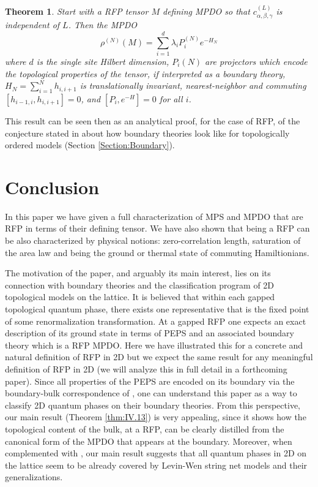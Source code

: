\documentclass{elsarticle}
\newtheorem{thm}{Theorem}[section]
\begin{document}
\begin{thm}
    Start with a  RFP tensor $M$  defining  MPDO so that $c_{\alpha,\beta,\gamma}^{(L)}$  is independent of $L$. Then the MPDO
    $$\rho^{(N)}(M)=\sum_{i=1}^d \lambda_i P^{(N)}_i e^{-H_N}$$ where $d$ is the single site Hilbert dimension, $P_i{(N)}$ are projectors which encode the {\em topological properties of the tensor, if interpreted as a boundary theory}, $H_N=\sum_{i=1}^Nh_{i,i+1}$ is translationally invariant, nearest-neighbor and commuting $[h_{i-1,i},h_{i,i+1}]=0$, and $[P_i,e^{-H}]=0$ for all $i$.
\end{thm}


This result can be seen then as an analytical proof, for the case of RFP, of the conjecture stated in \cite{bulkboundconj} about how boundary theories look like for topologically ordered models (Section \ref{Section:Boundary}).

\section{Conclusion}

In this paper we have given a full characterization of MPS and MPDO that are RFP in terms of their defining tensor. We have also shown that being a RFP can be also characterized by physical notions: zero-correlation length, saturation of the area law and being the ground or thermal state of commuting Hamiltionians.

The motivation of the paper, and arguably its main interest, lies on its connection with boundary theories and the classification program of 2D topological models on the lattice. It is believed that within each gapped topological quantum phase, there exists one representative that is the fixed point of some renormalization transformation. At a gapped RFP one expects an exact description of its ground state in terms of PEPS and an associated boundary theory which is a RFP MPDO. Here we have illustrated this for a concrete and natural definition of RFP in 2D but we expect the same result for any meaningful definition of RFP in 2D (we will analyze this in full detail in a forthcoming paper).  Since all properties of the PEPS are encoded on its boundary via the boundary-bulk correspondence of \cite{bulkboundary}, one can understand this paper as a way to classify 2D quantum phases on their boundary theories. From this perspective, our main result (Theorem \ref{thm:IV.13}) is very appealing, since it shows how the topological content of the bulk, at a RFP, can be clearly distilled from the canonical form of the MPDO that appears at the boundary.  Moreover, when complemented with \cite{FrankStrings}, our main result suggests that all quantum phases in 2D on the lattice seem to be already covered by Levin-Wen string net models and their generalizations.
\end{document}

